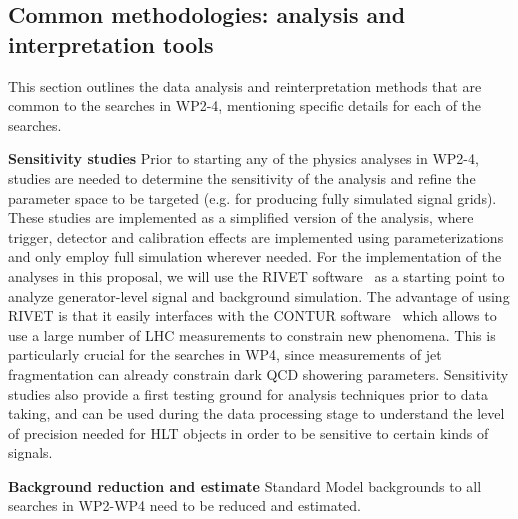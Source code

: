 \subsection{Common methodologies: analysis and interpretation tools}
\label{sub:CommonMethodsAnalysisTools}

This section outlines the data analysis and reinterpretation methods that are common to the searches in WP2-4, mentioning specific details for each of the searches. 

\textbf{Sensitivity studies} Prior to starting any of the physics analyses in WP2-4, studies are needed to determine the sensitivity of the analysis and refine the parameter space to be targeted (e.g. for producing fully simulated signal grids). 
These studies are implemented as a simplified version of the analysis, where trigger, detector and calibration effects are implemented using parameterizations and only employ full simulation wherever needed. 
For the implementation of the analyses in this proposal, we will use the RIVET software~\cite{ToBeCited}%
as a starting point to analyze generator-level signal and background simulation. 
The advantage of using RIVET is that it easily interfaces with the CONTUR software~\cite{ToBeCited}%
which allows to use a large number of LHC measurements to constrain new phenomena. 
This is particularly crucial for the searches in WP4, since measurements of jet fragmentation can already constrain dark QCD showering parameters. 
Sensitivity studies also provide a first testing ground for analysis techniques prior to data taking, and can be used during the data processing stage 
to understand the level of precision needed for HLT objects in order to be sensitive to certain kinds of signals. 

\textbf{Background reduction and estimate}
Standard Model backgrounds to all searches in WP2-WP4 need to be reduced and estimated. 

